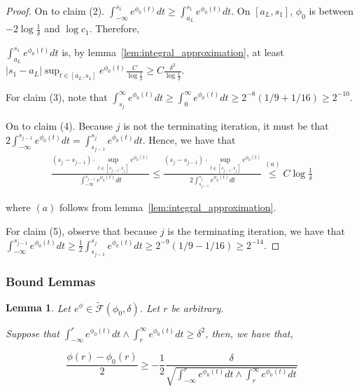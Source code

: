 \documentclass[12pt]{article}
\newtheorem{lemma}[theorem]{Lemma}
\begin{document}
\begin{proof}
  On to claim (2). $\int_{-\infty}^{s_1} e^{\phi_0(t)} dt \geq \int_{a_L}^{s_1} e^{\phi_0(t)} dt$. On $[a_L, s_1]$, $\phi_0$ is between $-2 \log \frac{1}{\delta}$ and $\log c_1$. Therefore, 

  $\int_{a_L}^{s_1} e^{\phi_0(t)} dt$ is, by lemma~\ref{lem:integral_approximation}, at least $|s_1 - a_L| \sup_{t \in [a_L, s_1]} e^{\phi_0(t)} \frac{C}{ \log \frac{1}{\delta}} \geq C \frac{\delta^2}{\log \frac{1}{\delta}}$.

  For claim (3), note that $\int_{s_j}^{\infty} e^{\phi_0(t)} dt \geq \int_0^{\infty} e^{\phi_0(t)} dt \geq 2^{-8} (1/9 + 1/16) \geq 2^{-10}$.

  On to claim (4). Because $j$ is not the terminating iteration, it must be that $2 \int_{-\infty}^{s_{j-1}} e^{\phi_0(t)} dt = \int_{s_{j-1}}^{s_j} e^{\phi_0(t)} dt$. Hence, we have that
  \begin{align*}
    \frac{(s_j - s_{j-1}) \cdot \sup_{t \in [s_{j-1}, s_j]} e^{\phi_0(t)} }{\int_{-\infty}^{s_{j-1}} e^{\phi_0(t)} dt } \leq
    \frac{(s_j - s_{j-1}) \cdot \sup_{t \in [s_{j-1}, s_j]} e^{\phi_0(t)} }{2 \int_{s_{j-1}}^{s_j} e^{\phi_0(t)} dt } 
    \stackrel{(a)} \leq C \log \frac{1}{\delta}
  \end{align*}

  where $(a)$ follows from lemma~\ref{lem:integral_approximation}.

  For claim (5), observe that because $j$ is the terminating iteration, we have that $\int_{-\infty}^{s_{j-1}} e^{\phi_0(t)}dt \geq \frac{1}{2} \int_{s_{j-1}}^{s_j} e^{\phi_0(t)} dt \geq 2^{-9} (1/9 - 1/16) \geq 2^{-14}$. 
  
\end{proof}

\subsubsection{Bound Lemmas}

\begin{lemma}
  \label{lem:envelope_lower_bound}
  Let $e^{\phi} \in \tilde{\mathcal{F}}(\phi_0, \delta)$. Let $r$ be arbitrary.

  Suppose that $\int_{-\infty}^r e^{\phi_0(t)} dt \wedge \int_r^{\infty} e^{\phi_0(t)}dt \geq \delta^2$, then, we have that,

  \[
    \frac{\phi(r) - \phi_0(r)}{2} \geq
    - \frac{1}{2} \frac{\delta}{\sqrt{ \int_{-\infty}^r e^{\phi_0(t)} dt \wedge \int_r^{\infty} e^{\phi_0(t)}dt }}
  \]
\end{lemma}
\end{document}
